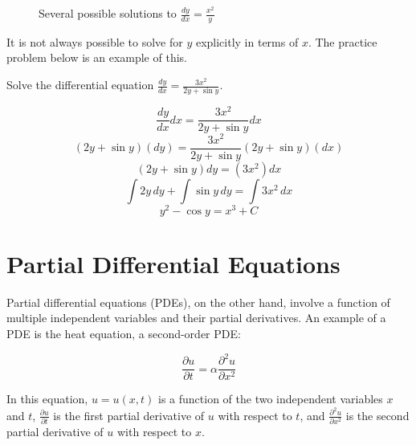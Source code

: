 \begin{figure}[htbp]
\centering
    \caption{Several possible solutions to $\frac{dy}{dx} = 
    \frac{x^2}{y}$}
    \label{fig:solutions}
\end{figure}

It is not always possible to solve for $y$ explicitly in terms of 
$x$. The practice problem below is an example of this. 

\begin{Exercise}[label = diffeq1]
	Solve the differential equation $\frac{dy}{dx} = \frac{3x^2}{2y + \sin{y}}$. 
\end{Exercise}

\begin{Answer}[ref = diffeq1]
	$$\frac{dy}{dx} dx = \frac{3x^2}{2y + \sin{y}} dx$$
	$$(2y + \sin{y})(dy) = \frac{3x^2}{2y + \sin{y}}(2y + \sin{y})(dx)$$
	$$(2y + \sin{y})dy = (3x^2)dx$$
	$$\int 2y\,dy + \int \sin{y}\,dy = \int 3x^2\,dx$$
	$$y^2 - \cos{y} = x^3 + C$$
\end{Answer}

\section{Partial Differential Equations}

Partial differential equations (PDEs), on the other hand, involve a
function of multiple independent variables and their partial
derivatives. An example of a PDE is the heat equation, a second-order
PDE: 

\begin{equation}
\frac{\partial u}{\partial t} = \alpha \frac{\partial^2 u}{\partial x^2}
\end{equation}

In this equation, $u = u(x, t)$ is a function of the two independent
variables $x$ and $t$, $\frac{\partial u}{\partial t}$ is the first
partial derivative of $u$ with respect to $t$, and $\frac{\partial^2
  u}{\partial x^2}$ is the second partial derivative of $u$ with
respect to $x$.



